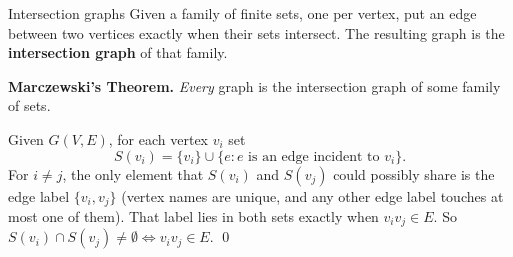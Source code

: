 \begin{prob}{Intersection graphs}
Given a family of finite sets, one per vertex, put an edge between two vertices exactly when
their sets intersect. The resulting graph is the \textbf{intersection graph} of that family.
\end{prob}

\begin{correct}
\textbf{Marczewski's Theorem.} \emph{Every} graph is the intersection graph of some family of
sets.

\prf Given $G(V,E)$, for each vertex $v_i$ set
\[
  S(v_i)=\{v_i\}\cup\{e: e\text{ is an edge incident to }v_i\}.
\]
For $i\ne j$, the only element that $S(v_i)$ and $S(v_j)$ could possibly share is the edge label
$\{v_i,v_j\}$ (vertex names are unique, and any other edge label touches at most one of them).
That label lies in both sets exactly when $v_iv_j\in E$. So
$S(v_i)\cap S(v_j)\ne\emptyset\iff v_iv_j\in E$. \qed
\end{correct}

